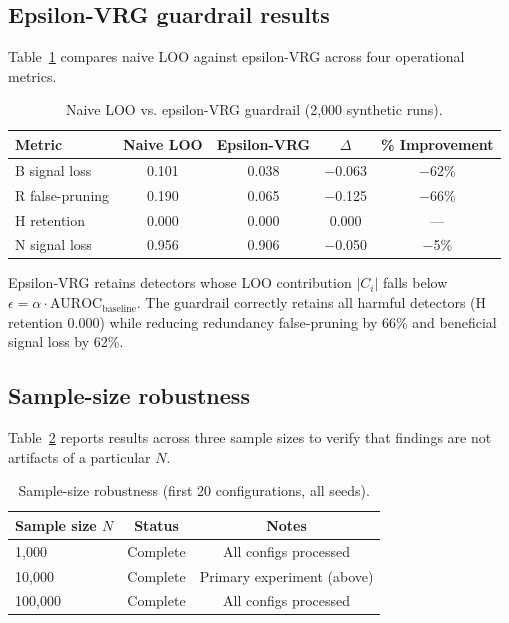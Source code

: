 \subsection{Epsilon-VRG guardrail results}

Table~\ref{tab:epsilon_vrg} compares naive LOO against epsilon-VRG across four operational metrics.

\begin{table}[h]
\centering
\caption{Naive LOO vs. epsilon-VRG guardrail (2,000 synthetic runs).}
\label{tab:epsilon_vrg}
\begin{tabular}{lcccc}
\toprule
Metric & Naive LOO & Epsilon-VRG & $\Delta$ & \% Improvement \\
\midrule
B signal loss & 0.101 & 0.038 & $-$0.063 & $-$62\% \\
R false-pruning & 0.190 & 0.065 & $-$0.125 & $-$66\% \\
H retention & 0.000 & 0.000 & 0.000 & --- \\
N signal loss & 0.956 & 0.906 & $-$0.050 & $-$5\% \\
\bottomrule
\end{tabular}
\end{table}

Epsilon-VRG retains detectors whose LOO contribution $|C_i|$ falls below $\epsilon = \alpha \cdot \text{AUROC}_{\text{baseline}}$. The guardrail correctly retains all harmful detectors (H retention 0.000) while reducing redundancy false-pruning by 66\% and beneficial signal loss by 62\%.

\subsection{Sample-size robustness}

Table~\ref{tab:robustness} reports results across three sample sizes to verify that findings are not artifacts of a particular $N$.

\begin{table}[h]
\centering
\caption{Sample-size robustness (first 20 configurations, all seeds).}
\label{tab:robustness}
\begin{tabular}{lcc}
\toprule
Sample size $N$ & Status & Notes \\
\midrule
1,000 & Complete & All configs processed \\
10,000 & Complete & Primary experiment (above) \\
100,000 & Complete & All configs processed \\
\bottomrule
\end{tabular}
\end{table}

